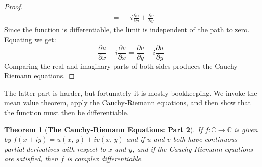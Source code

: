 \documentclass{article}
\newtheorem{theorem}{Theorem}[section]
\theoremstyle{definition}
\begin{document}
\begin{proof}
\begin{equation}
\begin{array}{rcl}
                    &=&
                    \displaystyle
                    -i\frac{\partial{u}}{\partial{y}}
                        +\frac{\partial{v}}{\partial{y}}
                \end{array}
            \end{equation}
            Since the function is differentiable, the limit is independent of
            the path to zero. Equating we get:
            \begin{equation}
                \frac{\partial{u}}{\partial{x}}
                +i\frac{\partial{v}}{\partial{x}}
                =
                \frac{\partial{v}}{\partial{y}}
                -i\frac{\partial{u}}{\partial{y}}
            \end{equation}
            Comparing the real and imaginary parts of both sides
            produces the Cauchy-Riemann equations.
        \end{proof}
        The latter part is harder, but fortunately it is mostly bookkeeping.
        We invoke the mean value theorem, apply the Cauchy-Riemann equations,
        and then show that the function must then be differentiable.
        \begin{theorem}[\textbf{The Cauchy-Riemann Equations: Part 2}]
            If $f:\mathbb{C}\rightarrow\mathbb{C}$ is given by
            $f(x+iy)=u(x,\,y)+iv(x,\,y)$ and if $u$ and $v$ both have
            continuous partial derivatives with respect to $x$ and $y$,
            and if the Cauchy-Riemann equations are satisfied, then $f$ is
            complex differentiable.
        \end{theorem}
\end{document}
